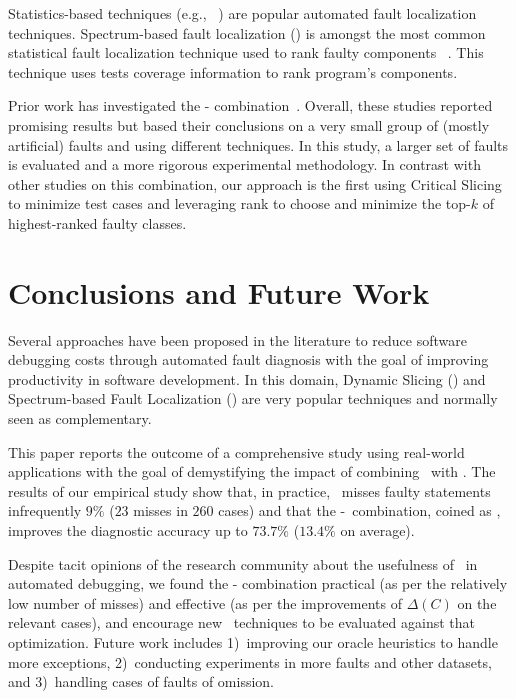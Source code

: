 \documentclass{article}
\begin{document}
Statistics-based techniques (e.g., ~\cite{Pearson:2017:EIF:3097368.3097441}) are
popular automated fault localization techniques. Spectrum-based fault
localization (\sfl{}) is amongst the most common statistical fault localization
technique used to rank faulty components
~\cite{7390282,DBLP:conf/kbse/JonesH05,DBLP:journals/smr/LuciaLJTB14,DBLP:journals/jss/AbreuZGG09}.
This technique uses tests coverage information to rank program's components.

Prior work has investigated the \ds{}-\sfl{}
combination~\cite{Wotawa:2010:FLB:1848650.1849235,Alves:2011:FUD:2190078.2190115,DBLP:conf/ecai/HoferW12,lei-mao-dai-wang-2012,slicing-sfl-repair,christi2018reduce}.
Overall, these studies reported promising results but based their conclusions
on a very small group of (mostly artificial) faults and using different
techniques. In this
study, a larger set of faults is evaluated and a more rigorous experimental
methodology.
In contrast with other studies on this combination,
our approach is the first using Critical Slicing to minimize test cases
and leveraging \sfl{} rank to choose and minimize the top-$k$ of
highest-ranked faulty classes.



\section{Conclusions and Future Work}
\label{sec:conc}
%

Several approaches have been proposed in the literature to reduce
software debugging costs through automated fault diagnosis with the
goal of improving productivity in software development. In this
domain, Dynamic Slicing (\ds) and Spectrum-based Fault Localization
(\sfl) are very popular techniques and normally seen as complementary.

This paper reports the outcome of a comprehensive study using
real-world applications with the goal of demystifying the impact of
combining \ds~with \sfl. The results of our empirical study show that,
in practice, \ds\ misses faulty statements infrequently $9\%$ ($23$
misses in $260$ cases) and that the \ds-\sfl~combination, coined as
, improves the diagnostic accuracy up to $73.7\%$ ($13.4\%$
on average).

Despite tacit opinions of the research community about the usefulness
of \ds~in automated debugging, we found the \ds{}-\sfl{} combination
practical (as per the relatively low number of misses) and effective
(as per the improvements of $\Delta(C)$ on the relevant cases), and
encourage new \sfl~techniques to be evaluated against that
optimization. Future work includes 1)~improving our oracle heuristics
to handle more exceptions, 2)~conducting experiments in more \dfj{}
faults and other datasets, and 3)~handling cases of faults of
omission.
\end{document}
